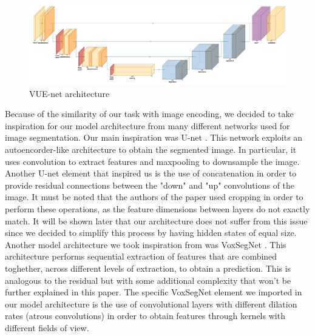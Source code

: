 \begin{figure}[ht]
  \centering
  \includegraphics[width=\textwidth]{images/VUE_net_model.png}
  \caption{VUE-net architecture}
  \label{fig:model}
\end{figure}

Because of the similarity of our task with image encoding, we decided to take inspiration for our model architecture
from many different networks used for image segmentation. Our main inspiration was U-net \cite{Unet}.
This network exploits an autoencorder-like architecture to obtain the segmented image.
In particular, it uses convolution to extract features and maxpooling to downsample the image.
Another U-net element that inspired us is the use of concatenation in order to provide
residual connections between the "down" and "up" convolutions of the image. It must be noted that
the authors of the paper used cropping in order to perform these operations, as the feature dimensions between layers do not exactly match. 
It will be shown later that our architecture does not suffer from this issue since we decided to simplify 
this process by having hidden states of equal size.
Another model architecture we took inspiration from was VoxSegNet \cite{VoxSegNet}. This architecture performs 
sequential extraction of features that are combined toghether, across different levels of extraction, to obtain a prediction. 
This is analogous to the residual but with some additional complexity that won't be
further explained in this paper. 
The specific VoxSegNet element we imported in our model architecture is the use of convolutional layers with different dilation rates 
(atrous convolutions) in order to obtain features through kernels with different fields of view.

